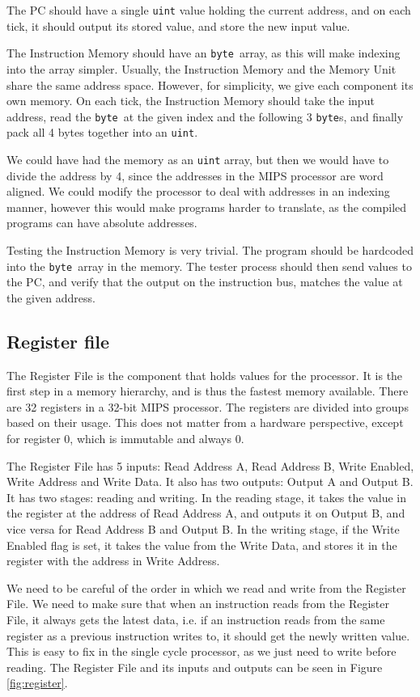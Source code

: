 The PC should have a single \texttt{uint} value holding the current address,
and on each tick, it should output its stored value, and store the new input
value.

The Instruction Memory should have an \texttt{byte} array, as this will make
indexing into the array simpler. Usually, the Instruction Memory and the Memory
Unit share the same address space. However, for simplicity, we give each
component its own memory. On each tick, the Instruction Memory should take the
input address, read the \texttt{byte} at the given index and the following 3
\texttt{byte}s, and finally pack all 4 bytes together into an \texttt{uint}.

We could have had the memory as an \texttt{uint} array, but then we would have
to divide the address by 4, since the addresses in the MIPS processor are word
aligned. We could modify the processor to deal with addresses in an indexing
manner, however this would make programs harder to translate, as the compiled
programs can have absolute addresses.

Testing the Instruction Memory is very trivial. The program should be hardcoded
into the \texttt{byte} array in the memory. The tester process should then send
values to the PC, and verify that the output on the instruction bus, matches
the value at the given address.

\subsection{Register file}
The Register File is the component that holds values for the processor. It is
the first step in a memory hierarchy, and is thus the fastest memory available.
There are 32 registers in a 32-bit MIPS processor. The registers are divided
into groups based on their usage. This does not matter from a hardware
perspective, except for register 0, which is immutable and always 0.

The Register File has 5 inputs: Read Address A, Read Address B, Write Enabled,
Write Address and Write Data. It also has two outputs: Output A and Output B.
It has two stages: reading and writing. In the reading stage, it takes the
value in the register at the address of Read Address A, and outputs it on
Output B, and vice versa for Read Address B and Output B. In the writing stage,
if the Write Enabled flag is set, it takes the value from the Write Data, and
stores it in the register with the address in Write Address.

We need to be careful of the order in which we read and write from the Register
File. We need to make sure that when an instruction reads from the Register
File, it always gets the latest data, i.e. if an instruction reads from the
same register as a previous instruction writes to, it should get the newly
written value. This is easy to fix in the single cycle processor, as we just
need to write before reading. The Register File and its inputs and outputs can
be seen in Figure \ref{fig:register}.


